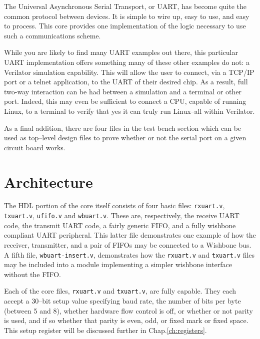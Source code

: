 \documentclass{gqtekspec}
\begin{document}
The Universal Asynchronous Serial Transport, or UART, has become quite the
common protocol between devices.  It is simple to wire up, easy to use, and
easy to process.  This core provides one implementation of the logic necessary
to use such a communications scheme.


While you are likely to find many UART examples out there, this particular
UART implementation offers something many of these other examples do not: a
Verilator simulation capability.  This will allow the user to connect, via
a TCP/IP port or a telnet application, to the UART of their desired chip.  As
a result, full two-way interaction can be had between a simulation and a
terminal or other port.  Indeed, this may even be sufficient to connect a 
CPU, capable of running Linux, to a terminal to verify that yes it can truly
run Linux--all within Verilator.

As a final addition, there are four files in the test bench section which can
be used as top--level design files to prove whether or not the serial port on
a given circuit board works.

\chapter{Architecture}\label{ch:arch}

The HDL portion of the core itself consists of four basic files: {\tt rxuart.v},
{\tt txuart.v}, {\tt ufifo.v} and {\tt wbuart.v}.  These are, respectively, the
receive UART code, the transmit UART code, a fairly generic FIFO, and a fully
wishbone compliant UART peripheral.  This latter file demonstrates one example
of how the receiver, transmitter, and a pair of FIFOs may be connected to a
Wishbone bus.  A fifth file, {\tt wbuart-insert.v}, demonstrates how the
{\tt rxuart.v} and {\tt txuart.v} files may be included into a module
implementing a simpler wishbone interface without the FIFO.

Each of the core files, {\tt rxuart.v} and {\tt txuart.v}, are fully capable.
They each accept a 30--bit setup value specifying baud rate, the number of bits
per byte (between 5 and 8), whether hardware flow control is off, or whether or
not parity is used, and if so whether that parity is even, odd, or fixed mark
or fixed space.  This setup register will be discussed further in
Chap.\ref{ch:registers}.
\end{document}
